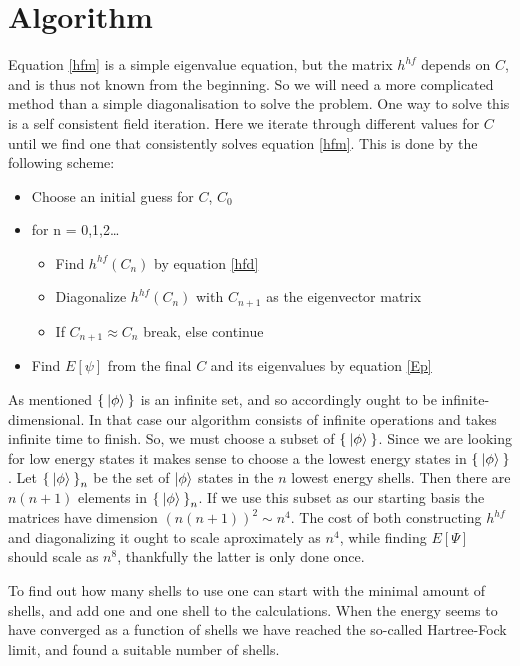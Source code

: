 \documentclass[a4paper,english,12pt]{article}
\begin{document}
\section{Algorithm}
Equation \ref{hfm} is a simple eigenvalue equation, but the matrix  $h^{hf}$ depends on $C$, and is thus not known from the beginning. So we will need a more complicated
method than a simple diagonalisation to solve the problem. One way to solve this is a self consistent field iteration.\cite{mortenslides} Here we iterate through
different values for $C$ until we find one that consistently solves equation \ref{hfm}. This is done by the following scheme:
\begin{itemize}
\item
  Choose an initial guess for $C$, $C_0$
\item for n = 0,1,2\ldots
  \begin{itemize}
  \item Find $h^{hf}(C_n)$ by equation \ref{hfd}
  \item Diagonalize $h^{hf}(C_n)$ with $C_{n+1}$ as the eigenvector matrix
  \item If $C_{n+1}\approx C_n$ break, else continue
  \end{itemize}
\item
  Find $E[\psi]$ from the final $C$ and its eigenvalues by equation \ref{Ep}
\end{itemize}

As mentioned \(\Set{\Ket{\phi}}\) is an infinite set, and so accordingly ought to be infinite-dimensional.
In that case our algorithm consists of infinite operations and takes infinite time to finish.
So, we must choose a subset of \(\Set{\Ket{\phi}}\).
Since we are looking for low energy states it makes sense to choose a the lowest energy states in \(\Set{\Ket{\phi}}\).
Let \(\Set{\Ket{\phi}}_n\) be the set of $\ket{\phi}$ states in the $n$ lowest energy shells. Then there are $n(n+1)$ elements in
\(\Set{\Ket{\phi}}_n\). If we use this subset as our starting basis the matrices have dimension $(n(n+1))^2\sim n^4$. The cost of both constructing
$h^{hf}$ and diagonalizing it ought to scale aproximately as $n^4$, while finding $E[\Psi]$ should scale as $n^8$, thankfully the latter is only done
once.

To find out how many shells to use one can start with the minimal amount of shells, and add one and one shell to the calculations. When the energy seems
to have converged as a function of shells we have reached the so-called Hartree-Fock limit, and found a suitable number of shells.  
\end{document}
